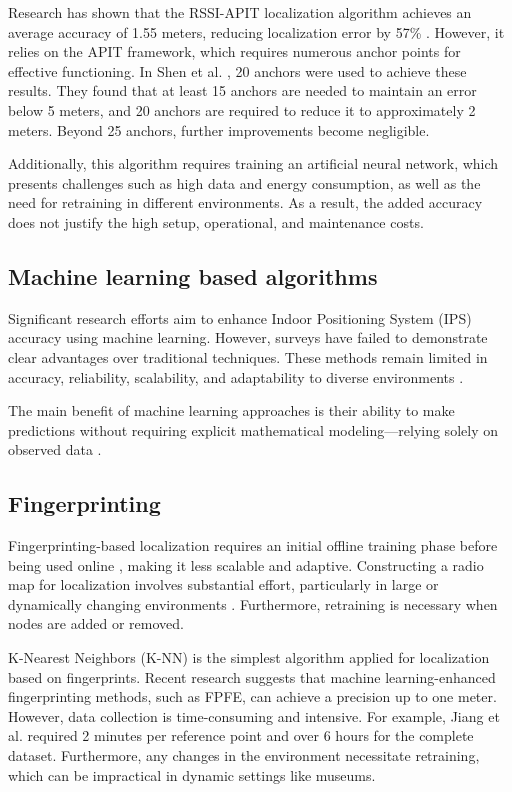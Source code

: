 Research has shown that the RSSI-APIT localization algorithm achieves an average accuracy of 1.55 meters, reducing localization error by 57\% \cite{shen_indoor_2023}. However, it relies on the APIT framework, which requires numerous anchor points for effective functioning. In Shen et al. \cite{shen_indoor_2023}, 20 anchors were used to achieve these results. They found that at least 15 anchors are needed to maintain an error below 5 meters, and 20 anchors are required to reduce it to approximately 2 meters. Beyond 25 anchors, further improvements become negligible.   

Additionally, this algorithm requires training an artificial neural network, which presents challenges such as high data and energy consumption, as well as the need for retraining in different environments. As a result, the added accuracy does not justify the high setup, operational, and maintenance costs. 

\subsection{Machine learning based algorithms}

Significant research efforts aim to enhance Indoor Positioning System (IPS) accuracy using machine learning. However, surveys have failed to demonstrate clear advantages over traditional techniques. These methods remain limited in accuracy, reliability, scalability, and adaptability to diverse environments \cite{nessa_survey_2020}.   

The main benefit of machine learning approaches is their ability to make predictions without requiring explicit mathematical modeling—relying solely on observed data \cite{nessa_survey_2020}.

\subsection{Fingerprinting}

Fingerprinting-based localization requires an initial offline training phase before being used online \cite{nessa_survey_2020}, making it less scalable and adaptive. Constructing a radio map for localization involves substantial effort, particularly in large or dynamically changing environments \cite{nessa_survey_2020}. Furthermore, retraining is necessary when nodes are added or removed.   

K-Nearest Neighbors (K-NN) is the simplest algorithm applied for localization based on fingerprints. Recent research suggests that machine learning-enhanced fingerprinting methods, such as FPFE, can achieve a precision up to one meter. However, data collection is time-consuming and intensive. For example, Jiang et al. \cite{jiang_fingerprint_2021} required 2 minutes per reference point and over 6 hours for the complete dataset. Furthermore, any changes in the environment necessitate retraining, which can be impractical in dynamic settings like museums.

